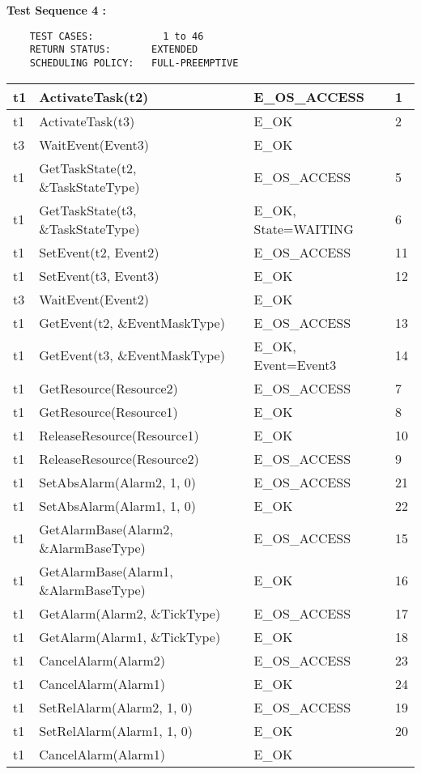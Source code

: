 \documentclass[10pt]{article}
\newlength{\Li}\settowidth{\Li}{Running}
\newlength{\Lii}\setlength{\Lii}{7cm}
\newlength{\Liiii}\setlength{\Liiii}{0.9cm}
\newlength{\Liii}\setlength{\Liii}{\textwidth} \addtolength{\Liii}{-\Li} \addtolength{\Liii}{-\Lii} \addtolength{\Liii}{-\Liiii}
\begin{document}
	\textbf{Test Sequence 4 :}
	\begin{lstlisting}
	TEST CASES:		       1 to 46
	RETURN STATUS:	  	 EXTENDED
	SCHEDULING POLICY:   FULL-PREEMPTIVE
	\end{lstlisting}
	
	
	\begin{supertabular}{|p{\Li}|p{\Lii}|p{\Liii}|p{\Liiii}|} \hline 
	t1		& ActivateTask(t2)								& E\_OS\_ACCESS					& 1 \\ \hline
	t1		& ActivateTask(t3)								& E\_OK							& 2 \\ \hline
	t3		& WaitEvent(Event3)								& E\_OK							& \\ \hline
	t1		& GetTaskState(t2, \&TaskStateType)				& E\_OS\_ACCESS					& 5 \\ \hline
	t1		& GetTaskState(t3, \&TaskStateType)				& E\_OK, State=WAITING				& 6 \\ \hline
	t1		& SetEvent(t2, Event2)							& E\_OS\_ACCESS					& 11 \\ \hline
	t1		& SetEvent(t3, Event3)							& E\_OK							& 12 \\ \hline
	t3		& WaitEvent(Event2)								& E\_OK							& \\ \hline
	t1		& GetEvent(t2, \&EventMaskType)					& E\_OS\_ACCESS					& 13 \\ \hline
	t1		& GetEvent(t3, \&EventMaskType)					& E\_OK, Event=Event3				& 14 \\ \hline
	
	t1		& GetResource(Resource2)						& E\_OS\_ACCESS					& 7 \\ \hline
	t1		& GetResource(Resource1)						& E\_OK							& 8 \\ \hline
	t1		& ReleaseResource(Resource1)					& E\_OK							& 10 \\ \hline
	t1		& ReleaseResource(Resource2)					& E\_OS\_ACCESS					& 9 \\ \hline
	
	t1		& SetAbsAlarm(Alarm2, 1, 0)						& E\_OS\_ACCESS					& 21 \\ \hline
	t1		& SetAbsAlarm(Alarm1, 1, 0)						& E\_OK							& 22 \\ \hline
	t1		& GetAlarmBase(Alarm2, \&AlarmBaseType)			& E\_OS\_ACCESS					& 15 \\ \hline
	t1		& GetAlarmBase(Alarm1, \&AlarmBaseType)			& E\_OK							& 16 \\ \hline
	t1		& GetAlarm(Alarm2, \&TickType)					& E\_OS\_ACCESS					& 17 \\ \hline
	t1		& GetAlarm(Alarm1, \&TickType)					& E\_OK							& 18 \\ \hline
	t1		& CancelAlarm(Alarm2)							& E\_OS\_ACCESS					& 23 \\ \hline
	t1		& CancelAlarm(Alarm1)							& E\_OK							& 24 \\ \hline
	t1		& SetRelAlarm(Alarm2, 1, 0)						& E\_OS\_ACCESS					& 19 \\ \hline
	t1		& SetRelAlarm(Alarm1, 1, 0)						& E\_OK							& 20 \\ \hline
	t1		& CancelAlarm(Alarm1)							& E\_OK							& \\ \hline
	

\end{supertabular}
\end{document}
